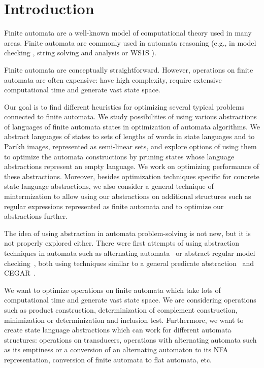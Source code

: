 \chapter{Introduction}


Finite automata are a well-known model of computational theory used in many areas. Finite automata are commonly used in automata reasoning (e.g., in model checking \cite{DBLP:conf/cav/SiegelY20}, string solving and analysis \cite{DBLP:conf/popl/LinB16} or WS1S \cite{DBLP:conf/tacas/FiedorHJLV17, DBLP:journals/acta/FiedorHLV19}).

Finite automata are conceptually straightforward. However, operations on finite automata are often expensive: have high complexity, require extensive computational time and generate vast state space.

Our goal is to find different heuristics for optimizing several typical problems connected to finite automata. We study possibilities of using various abstractions of languages of finite automata states in optimization of automata algorithms. We abstract languages of states to sets of lengths of words in state languages and to Parikh images, represented as semi-linear sets, and explore options of using them to optimize the automata constructions by pruning states whose language abstractions represent an empty language. We work on optimizing performance of these abstractions. Moreover, besides optimization techniques specific for concrete state language abstractions, we also consider a general technique of mintermization to allow using our abstractions on additional structures such as regular expressions represented as finite automata and to optimize our abstractions further.

The idea of using abstraction in automata problem-solving is not new, but it is not properly explored either. There were first attempts of using abstraction techniques in automata such as alternating automata~\cite{GANTY20103444} or abstract regular model checking~\cite{method_model_checking_tool}, both using techniques similar to a general predicate abstraction~\cite{DBLP:conf/cav/ColonU98, DBLP:conf/cav/GrafS97} and CEGAR~\cite{DBLP:conf/cav/ClarkeGJLV00}.

We want to optimize operations on finite automata which take lots of computational time and generate vast state space. We are considering operations such as product construction, determinization of complement construction, minimization or determinization and inclusion test. Furthermore, we want to create state language abstractions which can work for different automata structures: operations on transducers, operations with alternating automata such as its emptiness or a conversion of an alternating automaton to its NFA representation, conversion of finite automata to flat automata, etc.

